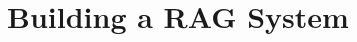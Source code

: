 \documentclass[../main.tex]{subfiles}
\begin{document}
\chapter{Building a RAG System}
























\printglossaries
\end{document}
